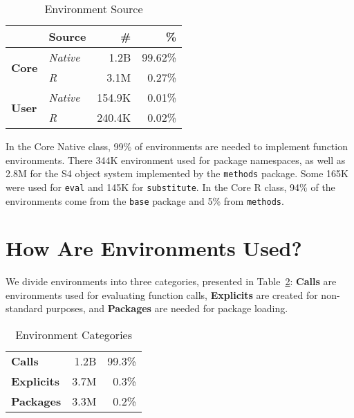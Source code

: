 \documentclass[sigplan,screen]{acmart}
\renewcommand{\c}[1]{\lstinline |#1|\xspace}
\begin{document}
\begin{table}[!h]\small\centering
  \caption{Environment Source}\label{table:env_source}
  \begin{tabular}{llrr}\toprule
  &\textbf{Source}&\textbf{\#}&\textbf{\%}\\\midrule
\multirow{2}{*}{\textbf{Core}}&\multicolumn{1}{l}{\emph{Native}}&\multicolumn{1}{r}{1.2B}&\multicolumn{1}{r}{99.62\%}\\
                               & \multicolumn{1}{l}{\emph{R}}     & \multicolumn{1}{r}{3.1M} & \multicolumn{1}{r}{0.27\%}\\\midrule
\multirow{2}{*}{\textbf{User}}  & \multicolumn{1}{l}{\emph{Native}} & \multicolumn{1}{r}{154.9K} & \multicolumn{1}{r}{0.01\%}\\
                                & \multicolumn{1}{l}{\emph{R}}      & \multicolumn{1}{r}{240.4K} & \multicolumn{1}{r}{0.02\%}\\\bottomrule
  \end{tabular}
\end{table}

\noindent
In the Core Native class, 99\% of environments are needed to implement function
environments. There 344K environment used for package namespaces, as well as
2.8M for the S4 object system implemented by the \c{methods} package. Some 165K
were used for \c{eval} and 145K for \c{substitute}. In the Core R class, 94\% of
the environments come from the \c{base} package and 5\% from \c{methods}.


\section{How Are Environments Used?}

We divide environments into three categories, presented in
Table~\ref{table:env_category}: \textbf{Calls} are environments used for
evaluating function calls, \textbf{Explicits} are created for non-standard
purposes, and \textbf{Packages} are needed for package loading.

\begin{table}[!h] \small
  \caption{Environment Categories} \label{table:env_category}\centering
  \begin{tabular}{lrr}\toprule
     \textbf{Calls}&     1.2B& 99.3\%\\
    \textbf{Explicits}& 3.7M& 0.3\%\\
    \textbf{Packages}&  3.3M& 0.2\%\\\bottomrule
  \end{tabular}
\end{table}
\end{document}
